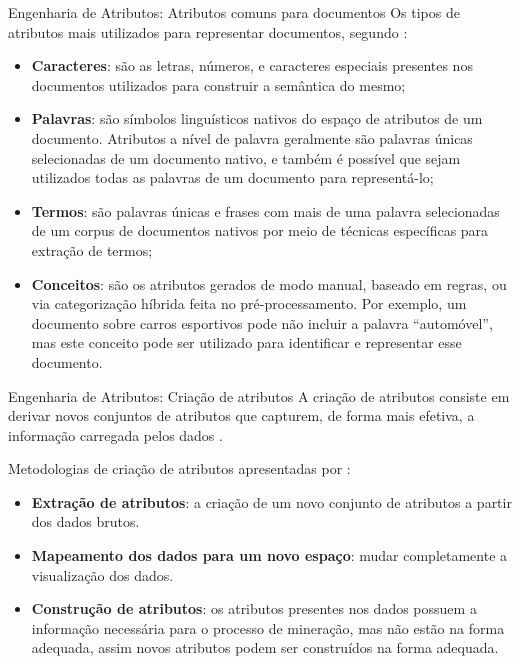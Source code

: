 \documentclass[%
  10pt,%
  aspectratio = 169,%
  compress,%
  t,%
]{beamer}%
\begin{document}
    \begin{frame}[fragile = singleslide]{}{Engenharia de Atributos: Atributos comuns para documentos}
        Os tipos de atributos mais utilizados para representar documentos, segundo  \cite[p.~5--7]{Feldman:2006:TMH:1076381}:
        \begin{itemize}
            \item \textbf{Caracteres}: são as letras, números, e caracteres especiais presentes nos documentos utilizados para construir a semântica do mesmo;
            
            \item \textbf{Palavras}: são símbolos linguísticos nativos do espaço de atributos de um documento. 
            Atributos a nível de palavra geralmente são palavras únicas selecionadas de um documento nativo, e também é possível que sejam utilizados todas as palavras de um documento para representá-lo;
            
            \item \textbf{Termos}: são palavras únicas e frases com mais de uma palavra selecionadas de um corpus de documentos nativos por meio de técnicas específicas para extração de termos;
            
            \item \textbf{Conceitos}: são os atributos gerados de modo manual, baseado em regras, ou via categorização híbrida feita no pré-processamento. 
            Por exemplo, um documento sobre carros esportivos pode não incluir a palavra ``automóvel'', mas este conceito pode ser utilizado para identificar e representar esse documento.
        \end{itemize}
        
    \end{frame}
    
    \begin{frame}[fragile = singleslide]{}{Engenharia de Atributos: Criação de atributos}
        A criação de atributos consiste em derivar novos conjuntos de atributos que capturem, de forma mais efetiva, a informação carregada pelos dados \cite[p.~55]{TanIDM2014}.
        
        Metodologias de criação de atributos apresentadas por \cite[p.~55--57]{TanIDM2014}:
        \begin{itemize}
            \item \textbf{Extração de atributos}: a criação de um novo conjunto de atributos a partir dos dados brutos.
            
            \item \textbf{Mapeamento dos dados para um novo espaço}: mudar completamente a visualização dos dados.
            
            \item \textbf{Construção de atributos}: os atributos presentes nos dados possuem a informação necessária para o processo de mineração, mas não estão na forma adequada, assim novos atributos podem ser construídos na forma adequada. 
        \end{itemize}
        
    \end{frame}
    
\end{document}
